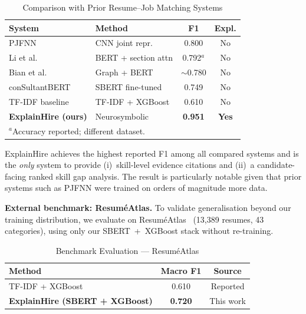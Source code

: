 \documentclass[conference]{IEEEtran}
\begin{document}
\begin{table}[htbp]
\caption{Comparison with Prior Resume--Job Matching Systems}
\label{tab:comparison}
\centering
\renewcommand{\arraystretch}{1.15}
\begin{tabular}{p{2.8cm}p{2.0cm}cc}
\toprule
\textbf{System} & \textbf{Method} & \textbf{F1} & \textbf{Expl.} \\
\midrule
PJFNN~\cite{zhu2018personjobfit}             & CNN joint repr.     & 0.800          & No  \\
Li et al.~\cite{li2020competence}            & BERT + section attn & 0.792$^{a}$    & No  \\
Bian et al.~\cite{bian2020multiview}         & Graph + BERT        & $\sim$0.780    & No  \\
conSultantBERT~\cite{lavi2021consultantbert} & SBERT fine-tuned    & 0.749          & No  \\
TF-IDF baseline~\cite{heakl2024resumeatlas}  & TF-IDF + XGBoost   & 0.610          & No  \\
\midrule
\textbf{ExplainHire (ours)}                  & Neurosymbolic       & \textbf{0.951} & \textbf{Yes} \\
\bottomrule
\multicolumn{4}{l}{\footnotesize $^{a}$Accuracy reported; different dataset.}
\end{tabular}
\end{table}

ExplainHire achieves the highest reported F1 among all compared systems
and is the \textit{only} system to provide (i)~skill-level evidence
citations and (ii)~a candidate-facing ranked skill gap analysis.
The result is particularly notable given that prior systems such as PJFNN
were trained on orders of magnitude more data.

\textbf{External benchmark: Resum\'eAtlas.}
To validate generalisation beyond our training distribution, we evaluate
on Resum\'eAtlas~\cite{heakl2024resumeatlas} (13,389 resumes, 43 categories),
using only our SBERT~+~XGBoost stack without re-training.

\begin{table}[htbp]
\caption{Benchmark Evaluation --- Resum\'eAtlas}
\label{tab:benchmark}
\centering
\begin{tabular}{lcc}
\toprule
\textbf{Method} & \textbf{Macro F1} & \textbf{Source} \\
\midrule
TF-IDF + XGBoost~\cite{heakl2024resumeatlas}  & 0.610          & Reported  \\
\textbf{ExplainHire (SBERT + XGBoost)}         & \textbf{0.720} & This work \\
\bottomrule
\end{tabular}
\end{table}
\end{document}

